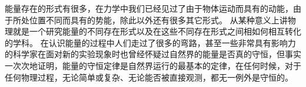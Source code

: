 能量存在的形式有很多，在力学中我们已经见过了由于物体运动而具有的动能，由于所处位置不同而具有的势能，除此以外还有很多其它形式。
从某种意义上讲物理就是一个研究能量的不同存在形式以及在这些不同存在形式之间相如何相互转化的学科。
在认识能量的过程中人们走过了很多的弯路，甚至一些非常具有影响力的科学家在面对新的实验现象时也曾经怀疑过自然界的能量是否真的守恒，但事实一次次地证明，能量的守恒定律是自然界运行的最基本的定律，在任何时候，对于任何物理过程，无论简单或复杂、无论能否被直接观测，都无一例外是守恒的。















